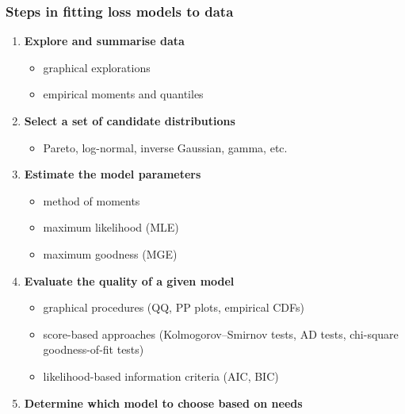 \documentclass[11pt]{article}
\newcommand{\noi}{\noindent}
\begin{document}
\subsubsection{Steps in fitting loss models to data}
\noi
\begin{enumerate}
  \item \textbf{Explore and summarise data}
    \begin{itemize}
      \item graphical explorations
      \item empirical moments and quantiles
    \end{itemize}
  \item \textbf{Select a set of candidate distributions}
    \begin{itemize}
      \item Pareto, log-normal, inverse Gaussian, gamma, etc.
    \end{itemize}
  \item \textbf{Estimate the model parameters}
    \begin{itemize}
      \item method of moments
      \item maximum likelihood (MLE)
      \item maximum goodness (MGE)
    \end{itemize}
  \item \textbf{Evaluate the quality of a given model}
    \begin{itemize}
      \item graphical procedures (QQ, PP plots, empirical CDFs)
      \item score-based approaches (Kolmogorov–Smirnov tests, AD tests, chi-square goodness-of-fit tests)
      \item likelihood-based information criteria (AIC, BIC)
    \end{itemize}
  \item \textbf{Determine which model to choose based on needs}
\end{enumerate}
\end{document}
